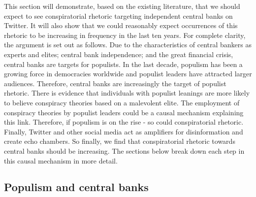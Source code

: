 \documentclass[11pt]{article}
\begin{document}
This section will demonstrate, based on the existing literature, that we should expect to see conspiratorial rhetoric targeting independent central banks on Twitter. It will also show that we could reasonably expect occurrences of this rhetoric to be increasing in frequency in the last ten years. For complete clarity, the argument is set out as follows. Due to the characteristics of central bankers as experts and elites; central bank independence; and the great financial crisis, central banks are targets for populists. In the last decade, populism has been a growing force in democracies worldwide and populist leaders have attracted larger audiences. Therefore, central banks are increasingly the target of populist rhetoric. There is evidence that individuals with populist leanings are more likely to believe conspiracy theories based on a malevolent elite. The employment of conspiracy theories by populist leaders could be a causal mechanism explaining this link. Therefore, if populism is on the rise - so could conspiratorial rhetoric. Finally, Twitter and other social media act as amplifiers for disinformation and create echo chambers. So finally, we find that conspiratorial rhetoric towards central banks should be increasing. The sections below break down each step in this causal mechanism in more detail.

\subsection{Populism and central banks} \label{subsection: Populism and central banks}
\end{document}
